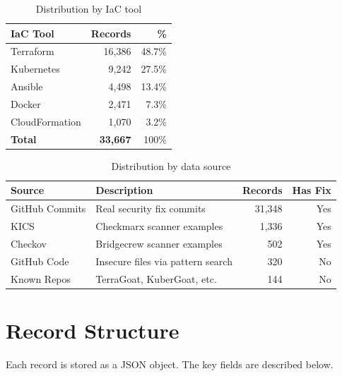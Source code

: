 \documentclass[11pt,a4paper]{article}
\begin{document}
\begin{table}[h]
\centering
\caption{Distribution by IaC tool}
\begin{tabular}{@{}lrr@{}}
\toprule
\textbf{IaC Tool} & \textbf{Records} & \textbf{\%} \\
\midrule
Terraform      & 16,386 & 48.7\% \\
Kubernetes     & 9,242  & 27.5\% \\
Ansible        & 4,498  & 13.4\% \\
Docker         & 2,471  &  7.3\% \\
CloudFormation & 1,070  &  3.2\% \\
\midrule
\textbf{Total} & \textbf{33,667} & 100\% \\
\bottomrule
\end{tabular}
\end{table}

\begin{table}[h]
\centering
\caption{Distribution by data source}
\begin{tabular}{@{}llrr@{}}
\toprule
\textbf{Source} & \textbf{Description} & \textbf{Records} & \textbf{Has Fix} \\
\midrule
GitHub Commits & Real security fix commits & 31,348 & Yes \\
KICS           & Checkmarx scanner examples & 1,336 & Yes \\
Checkov        & Bridgecrew scanner examples & 502   & Yes \\
GitHub Code    & Insecure files via pattern search & 320 & No \\
Known Repos    & TerraGoat, KuberGoat, etc. & 144 & No \\
\bottomrule
\end{tabular}
\end{table}

\section{Record Structure}

Each record is stored as a JSON object. The key fields are described below.
\end{document}
